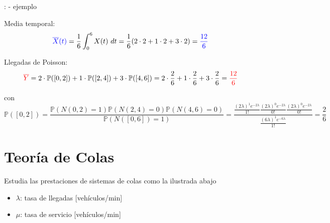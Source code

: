 \documentclass[xcolor={x11names}]{beamer}
\newcommand{\red}[1]{{\color{red}#1}}
\newcommand{\blue}[1]{{\color{blue}#1}}
\begin{document}
\begin{frame}{\secname: \subsecname - ejemplo}

    Media temporal: 
    \begin{equation*}
        \blue{\overline{X}(t)}=\frac{1}{6}\int_0^6 X(t)\ dt =\frac{1}{6} (2\cdot2 + 1\cdot2 + 3\cdot2) = \blue{\frac{12}{6}}
    \end{equation*}

    Llegadas de Poisson:
    \begin{equation*}
        \red{\overline{Y}} = 2\cdot\mathbb{P}([0,2]) + 1 \cdot\mathbb{P}([2,4]) + 3\cdot \mathbb{P}([4,6])=2\cdot\frac{2}{6} + 1 \cdot\frac{2}{6}+ 3\cdot\frac{2}{6}=\red{\frac{12}{6}}
    \end{equation*}

    \vfill

    \begin{figure}
        \resizebox{.4\textwidth}{!}{%
        }
    \end{figure}

    \vfill

    con
    \begin{equation*}%
        \scriptstyle
        \mathbb{P}([0,2])=\frac{\mathbb{P}(N(0,2)=1)\mathbb{P}(N(2,4)=0)\mathbb{P}(N(4,6)=0)}{\mathbb{P}(N([0,6])=1)}
                          =\frac{\frac{(2\lambda)^1e^{-2\lambda}}{1!} \frac{(2\lambda)^0e^{-2\lambda}}{0!} \frac{(2\lambda)^0e^{-2\lambda}}{0!} }{\frac{(6\lambda)^1e^{-6\lambda}}{1!}}=\frac{2}{6}%
    \end{equation*}%
\end{frame}



\section{Teoría de Colas}



\begin{frame}{\secname}
    Estudia las prestaciones de sistemas
    de colas como la ilustrada abajo

    \begin{figure}
        
    \end{figure}

    \begin{itemize}
        \item $\lambda$: tasa de llegadas
            [vehículos/min]
        \item $\mu$: tasa de servicio
            [vehículos/min]
    \end{itemize}
\end{frame}
\end{document}
